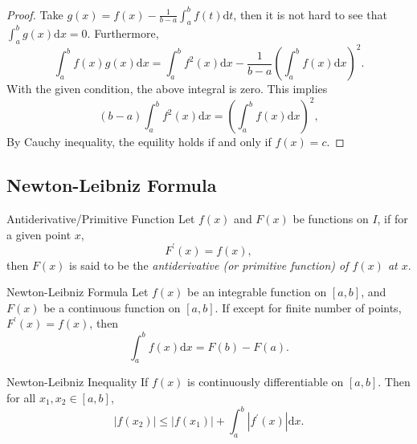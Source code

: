 \begin{proof}
  Take $g(x) = f(x) - \frac{1}{b-a}\int_a^b f(t)\mathrm{d} t$,
  then it is not hard to see that $\int_a^b g(x)\mathrm{d} x = 0$.
  Furthermore, 
  \begin{equation}
    \int_a^b f(x)g(x)\mathrm{d}x
    = \int_a^b f^2(x)\mathrm{d} x - \frac{1}{b-a} \left( \int_a^b f(x)\mathrm{d} x \right)^2.
  \end{equation}
  With the given condition, the above integral is zero.
  This implies
  \begin{equation}
    (b - a)\int_a^b f^2(x)\mathrm{d} x
    = \left( \int_a^b f(x)\mathrm{d} x \right)^2,
  \end{equation}
  By Cauchy inequality, the equility holds if and only if $f(x) = c$.
\end{proof}

\subsection{Newton-Leibniz Formula}

\begin{definition}{Antiderivative/Primitive Function}{}
  Let $f(x)$ and $F(x)$ be functions on $I$, if for a given point $x$,
  \begin{equation}
    F^{\prime}(x) = f(x),
  \end{equation}
  then $F(x)$ is said to be the \emph{antiderivative (or primitive function)
  of $f(x)$ at $x$}.
\end{definition}

\begin{theorem}{Newton-Leibniz Formula}{}
  Let $f(x)$ be an integrable function on $[a, b]$,
  and $F(x)$ be a continuous function on $[a, b]$.
  If except for finite number of points,
  $F^{\prime}(x) = f(x)$, then
  \begin{equation}
    \int_a^b f(x) \mathrm{d} x = F(b) - F(a).
  \end{equation}
\end{theorem}

\begin{corollary}{Newton-Leibniz Inequality}{}
  If $f(x)$ is continuously differentiable on $[a, b]$.
  Then for all $x_1, x_2 \in [a, b]$, 
  \begin{equation}
    |f(x_2)| \leq |f(x_1)| + \int_a^b |f^{\prime}(x)|\mathrm{d} x.
  \end{equation}
\end{corollary}

